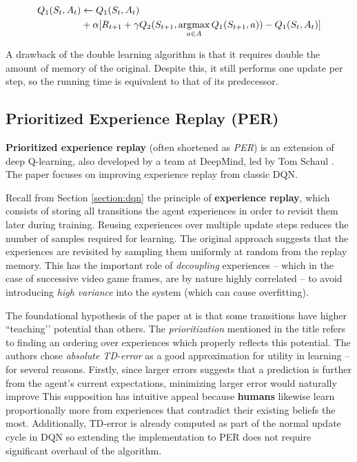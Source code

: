 \begin{equation} \label{eqn:double-learning-rule}
\begin{aligned}
Q_1(S_t, A_t) & \leftarrow Q_1(S_t, A_t) \\
    & + \alpha [ R_{t+1} + \gamma Q_2(S_{t+1}, \operatorname*{\arg\!\max}_{a \in A} Q_1(S_{t+1}, a)) - Q_1(S_t, A_t)]
\end{aligned}
\end{equation}

A drawback of the double learning algorithm is that it requires double the amount of memory of the original. 
Despite this, it still performs one update per step, so the running time is equivalent to that of its predecessor.

\subsection{Prioritized Experience Replay (PER)}
\textbf{Prioritized experience replay} (often shortened as \emph{PER}) is an extension of deep Q-learning, also developed by a team at DeepMind, led by Tom Schaul \cite{per-paper}.
The paper focuses on improving experience replay from classic DQN.

Recall from Section \ref{section:dqn} the principle of \textbf{experience replay}, which consists of storing all transitions the agent experiences in order to revisit them later during training.
Reusing experiences over multiple update steps reduces the number of samples required for learning.
The original approach suggests that the experiences are revisited by sampling them uniformly at random from the replay memory.
This has the important role of \emph{decoupling} experiences -- which in the case of successive video game frames, are by nature highly correlated -- to avoid introducing \emph{high variance} into the system (which can cause overfitting).

The foundational hypothesis of the paper at \cite{per-paper} is that some transitions have higher ``teaching’’ potential than others.
The \emph{prioritization} mentioned in the title refers to finding an ordering over experiences which properly reflects this potential.
The authors chose \emph{absolute TD-error} as a good approximation for utility in learning -- for several reasons.
Firstly, since larger errors suggests that a prediction is further from the agent’s current expectations, minimizing larger error would naturally improve 
This supposition has intuitive appeal because \textbf{humans} likewise learn proportionally more from experiences that contradict their existing beliefs the most.
Additionally, TD-error is already computed as part of the normal update cycle in DQN so extending the implementation to PER does not require significant overhaul of the algorithm.

